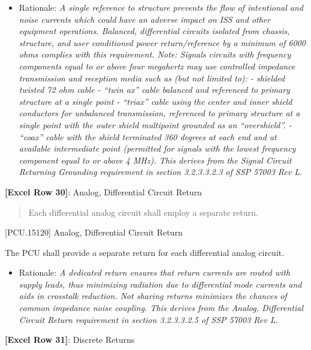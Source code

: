 \begin{itemize}
\item{} Rationale: \emph{A single reference to structure prevents the flow of intentional and noise currents which could have an adverse impact on ISS and other equipment operations. Balanced, differential circuits isolated from chassis, structure, and user conditioned power return\slash reference by a minimum of 6000 ohms complies with this requirement. Note: Signals circuits with frequency components equal to or above four megahertz may use controlled impedance transmission and reception media such as (but not limited to): - shielded twisted 72 ohm cable - ``twin ax'' cable balanced and referenced to primary structure at a single point - ``triax'' cable using the center and inner shield conductors for unbalanced transmission, referenced to primary structure at a single point with the outer shield multipoint grounded as an ``overshield''. - ``coax'' cable with the shield terminated 360 degrees at each end and at available intermediate point (permitted for signals with the lowest frequency component equal to or above 4 MHz). This derives from the Signal Circuit Returning Grounding requirement in section 3.2.3.3.2.3 of SSP 57003 Rev L.}

\end{itemize}

\textbf{[Excel Row 30]}: Analog, Differential Circuit Return

\begin{quote}
Each differential analog circuit shall employ a separate return.
\end{quote}

[PCU.15120] Analog, Differential Circuit Return

The PCU shall provide a separate return for each differential analog circuit.

\begin{itemize}
\item{} Rationale: \emph{A dedicated return ensures that return currents are routed with supply leads, thus minimizing radiation due to differential mode currents and aids in crosstalk reduction. Not sharing returns minimizes the chances of common impedance noise coupling. This derives from the Analog, Differential Circuit Return requirement in section 3.2.3.3.2.5 of SSP 57003 Rev L.}

\end{itemize}

\textbf{[Excel Row 31]}: Discrete Returns

